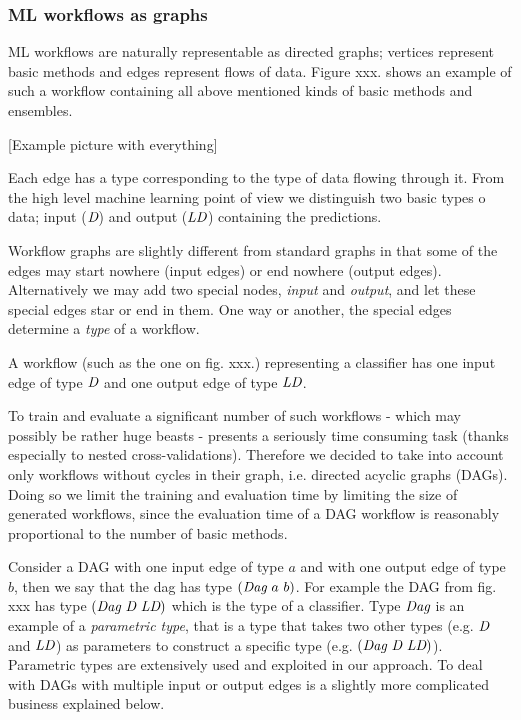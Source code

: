 \documentclass{ws-ijait}
\begin{document}
\subsubsection{ML workflows as graphs}
ML workflows are naturally representable as directed graphs; vertices represent basic methods and edges represent flows of data.
Figure xxx. shows an example of such a workflow containing all above mentioned kinds of basic methods and ensembles.

[Example picture with everything]

Each edge has a type corresponding to the type of data flowing through it. 
From the high level machine learning point of view we distinguish two basic types o data;
input \Dlong ($\textit{D}$) and output \LDlong ($\textit{LD}$) containing the predictions.

Workflow graphs are slightly different from standard graphs in that some of the edges may start nowhere (input edges) or end nowhere (output edges). 
Alternatively we may add two special nodes, \textit{input} and \textit{output}, and let these special edges star or end in them.
One way or another, the special edges determine a \textit{type} of a workflow.

A workflow (such as the one on fig. xxx.) representing a classifier has one input edge of type $\textit{D}$ and one output edge of type $\textit{LD}$.

To train and evaluate a significant number of such workflows - which may possibly be rather huge beasts -  presents a seriously time consuming task (thanks especially to nested cross-validations). Therefore we decided to take into account only workflows without cycles in their graph, i.e. directed acyclic graphs (DAGs). Doing so we limit the training and evaluation time by limiting the size of generated workflows, since the evaluation time of a DAG workflow is reasonably proportional to the number of basic methods.

Consider a DAG with one input edge of type $a$ and with one output edge of type $b$, then we say that the dag has type $(\textit{Dag}\ a\ b)$. 
For example the DAG from fig. xxx has type $(\textit{Dag}\ \textit{D}\ \textit{LD})$ which is the type of a classifier.
Type $\textit{Dag}$ is an example of a \textit{parametric type}, that is a type that takes two other types (e.g. $\textit{D}$ and $\textit{LD}$) as parameters to construct a specific type (e.g. $(\textit{Dag}\ \textit{D}\ \textit{LD})$).
Parametric types are extensively used and exploited in our approach.
To deal with DAGs with multiple input or output edges is a slightly more complicated business explained below.
\end{document}
